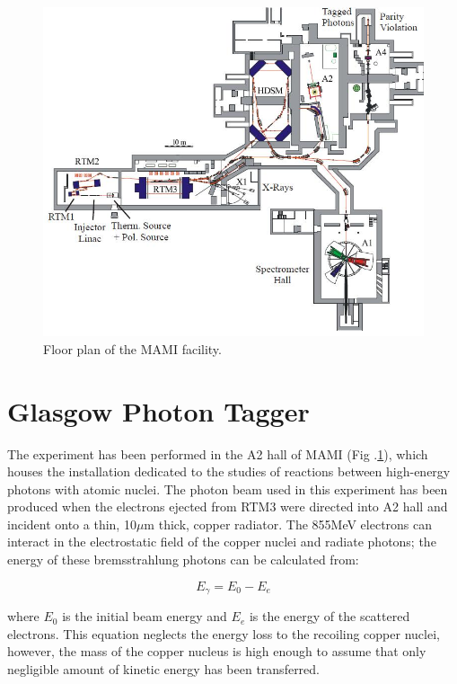 \begin{figure}[H]
\begin{center}
\includegraphics[scale=0.5]{pictures/jpg/mamifloor.jpg}
\caption{Floor plan of the MAMI facility.}
\label{mamifloor}
\end{center}
\end{figure}

\section{Glasgow Photon Tagger}

\indent The experiment has been performed in the A2 hall of MAMI (Fig .\ref{mamifloor}), which houses the installation dedicated to the studies of reactions between high-energy photons with atomic nuclei. The photon beam used in this experiment has been produced when the electrons ejected from RTM3 were directed into A2 hall and incident onto a thin, 10$\mu$m thick, copper radiator. The 855MeV electrons can interact in the electrostatic field of the copper nuclei and radiate photons; the energy of these bremsstrahlung photons can be calculated from:

\begin{equation}
E_{\gamma}=E_{0}-E_{e}
\end{equation}

where $E_{0}$ is the initial beam energy and $E_{e}$ is the energy of the scattered electrons. This equation neglects the energy loss to the recoiling copper nuclei, however, the mass of the copper nucleus is high enough to assume that only negligible amount of kinetic energy has been transferred.

